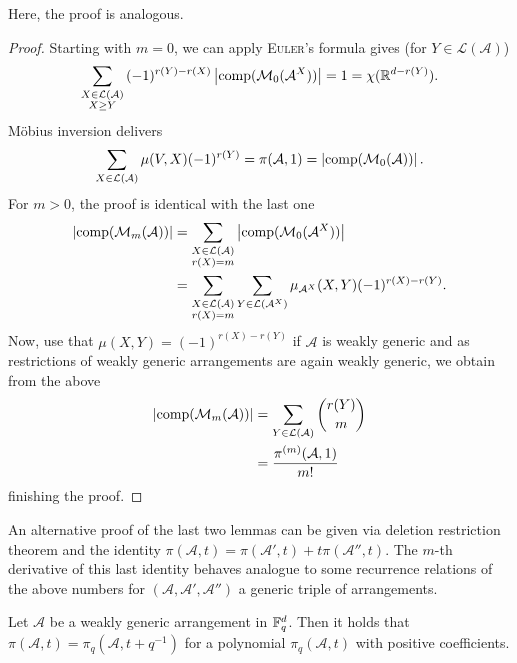 \documentclass[a4paper]{article}
\begin{document}
Here, the proof is analogous.

\begin{proof}
    Starting with $m=0$, we can apply \textsc{Euler}'s formula gives (for $Y\in\mathcal{L}(\mathcal{A})$)
    \begin{equation}
        \sum_{\substack{X\in\mathcal{L}(\mathcal{A})\\ X\geq Y}}{(-1)^{r(Y)-r(X)}\left|\mathop\mathrm{comp}(\mathcal{M}_0(\mathcal{A}^X))\right|}=1=\chi(\mathbb{R}^{d-r(Y)})\text{.}
  \end{equation}
  Möbius inversion delivers
  \begin{equation}
    \sum_{X\in\mathcal{L}(\mathcal{A})}{\mu(V,X)(-1)^{r(Y)}} = \pi(\mathcal{A},1) = \left|\mathop\mathrm{comp}(\mathcal{M}_0(\mathcal{A}))\right|\text{.}
  \end{equation}
  For $m>0$, the proof is identical with the last one
  \begin{align}
      \left|\mathop\mathrm{comp}(\mathcal{M}_m(\mathcal{A}))\right| &=\sum_{\substack{X\in\mathcal{L}(\mathcal{A})\\ r(X)=m}}{\left|\mathop\mathrm{comp}(\mathcal{M}_0(\mathcal{A}^X))\right|}\\
      & = \sum_{\substack{X\in\mathcal{L}(\mathcal{A})\\ r(X)=m}}{\sum_{Y\in\mathcal{L}(\mathcal{A}^X)}{\mu_{\mathcal{A}^X}(X,Y)(-1)^{r(X)-r(Y)}}}\text{.}
  \end{align}
  Now, use that $\mu(X,Y)=(-1)^{r(X)-r(Y)}$ if $\mathcal{A}$ is weakly generic and as restrictions of weakly generic arrangements are again weakly generic, we obtain from the above
  \begin{align}
      \abs{\comp(\mathcal{M}_m(\mathcal{A}))}
      & =\sum_{Y\in\mathcal{L}(\mathcal{A})}{\binom{r(Y)}{m}}\\
      & = \frac{\pi^{(m)}(\mathcal{A},1)}{m!}
  \end{align}
  finishing the proof.
\end{proof}

\begin{remark}
    An alternative proof of the last two lemmas can be given via deletion restriction theorem and the identity $\pi(\mathcal{A},t)=\pi(\mathcal{A}',t)+t\pi(\mathcal{A}'',t)$. The $m$-th derivative of this last identity behaves analogue to some recurrence relations of the above numbers for $(\mathcal{A},\mathcal{A}',\mathcal{A}'')$ a generic triple of arrangements.
\end{remark}

\begin{corollary}
    Let $\mathcal{A}$ be a weakly generic arrangement in $\mathbb{F}_{q}^d$. Then it holds that $\pi(\mathcal{A},t)=\pi_q(\mathcal{A},t+q^{-1})$ for a polynomial $\pi_q(\mathcal{A},t)$ with positive coefficients.
\end{corollary}
\end{document}
